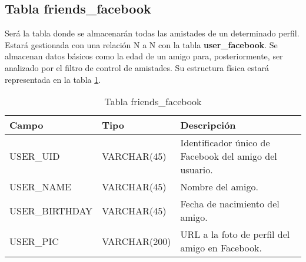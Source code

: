 \subsection{Tabla friends\_facebook}
Será la tabla donde se almacenarán todas las amistades de un determinado perfil. Estará gestionada con una relación N a N con la tabla \textbf{user\_facebook}. Se almacenan datos básicos como la edad de un amigo para, posteriormente, ser analizado por el filtro de control de amistades. Su estructura física estará representada en la tabla \ref{tabFriendsFacebook}.
\bigskip
\par
\begin{table}[h]
\begin{center}
\begin{tabular}{| l | l | p{60mm} |}\hline
\textbf{Campo}&\textbf{Tipo}&\textbf{Descripción} \\ \hline
USER\_UID & VARCHAR(45) & Identificador único de Facebook del amigo del usuario. \\ \hline
USER\_NAME & VARCHAR(45) & Nombre del amigo. \\ \hline
USER\_BIRTHDAY & VARCHAR(45) &  Fecha de nacimiento del amigo.\\ \hline
USER\_PIC & VARCHAR(200) &  URL a la foto de perfil del amigo en Facebook.\\ \hline
\end{tabular}
\end{center}
\caption{Tabla friends\_facebook} \label{tabFriendsFacebook}
\end{table}

